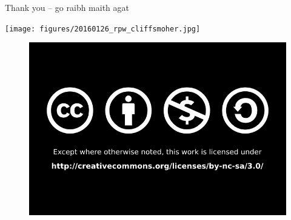 \documentclass[xcolor=svgnames]{beamer}
\newcommand{\1}{\'{\i}}
\begin{document}
%
%  
%  
%

\begin{frame}{Thank you -- go raibh maith agat}

\centering
\texttt{[image: figures/20160126\_rpw\_cliffsmoher.jpg]}

\end{frame}

\begin{frame}

\begin{figure}

\href{http://creativecommons.org/licenses/by-nc-sa/4.0/}{\includegraphics[scale=0.4]{figures/By_nc_sa_bw.png}}

\end{figure}

\end{frame}
\end{document}
